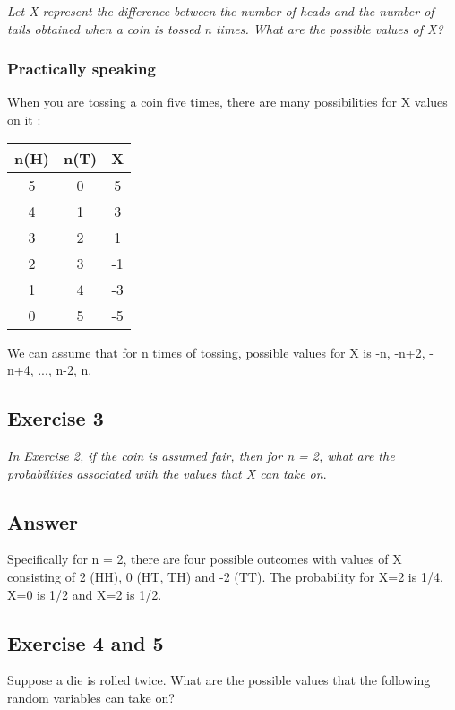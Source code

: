 \documentclass[12pt,a4paper]{article}
\begin{document}
\textit{Let X represent the difference between the number of heads and the number of tails obtained when a coin is tossed \textit{n} times. What are the possible values of X?}

\subsubsection{Practically speaking}

When you are tossing a coin five times, there are many possibilities for X values on it :

\begin{tabular}{|c|c|c|}
	\hline  n(H) & n(T)  & X  \\ 
	\hline  5    & 0     & 5  \\ 
	\hline  4    & 1     & 3  \\ 
	\hline  3    & 2     & 1  \\ 
	\hline  2    & 3     & -1  \\ 
	\hline  1    & 4     & -3  \\ 
	\hline  0    & 5     & -5  \\ 	
	\hline 
\end{tabular} 

We can assume that for n times of tossing, possible values for X is -n, -n+2, -n+4, ..., n-2, n.

\subsection{Exercise 3}

\textit{In Exercise 2, if the coin is assumed fair, then for n = 2, what are the probabilities associated with the values that X can take on}.

\subsection{Answer}

Specifically for n = 2, there are four possible outcomes with values of X consisting of 2 (HH), 0 (HT, TH) and -2 (TT). The probability for X=2 is 1/4, X=0 is 1/2 and X=2 is 1/2.  

\subsection{Exercise 4 and 5}

Suppose a die is rolled twice. What are the possible values that the following random variables can take on?
\end{document}

